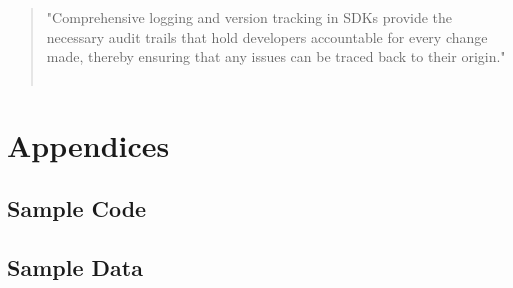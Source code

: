 \documentclass[runningheads,12pt]{llncs}
\begin{document}
\begin{quote}
    "Comprehensive logging and version tracking in SDKs provide the necessary audit trails that hold developers accountable for every change made, thereby ensuring that any issues can be traced back to their origin." ~\cite[para 7]{azure2020}
\end{quote}

\nocite{*}

\listoftables

\listoffigures




\section{Appendices}

\subsection{Sample Code}
\subsection{Sample Data}
\end{document}
